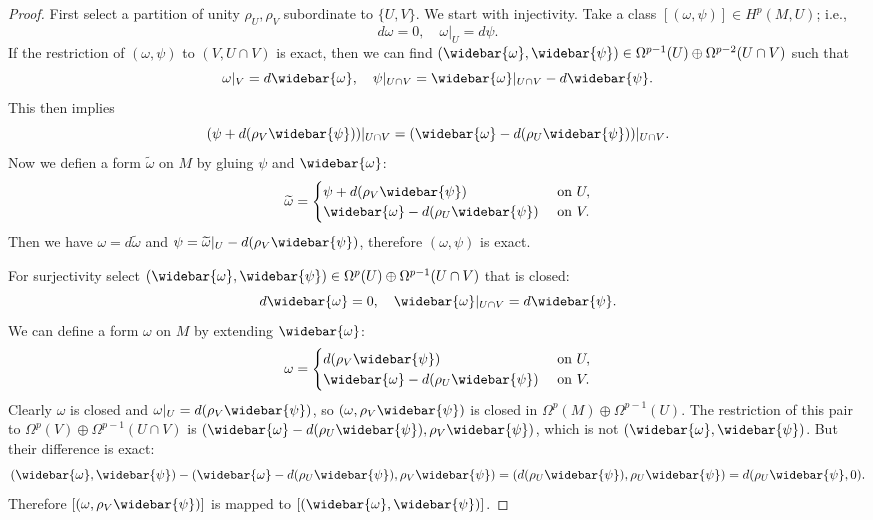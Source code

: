 \begin{proof}
First select a partition of unity $\rho_U,\rho_V$ subordinate to $\{U,V\}$. We start with injectivity. Take a class $[(\omega,\psi)]\in H^p(M,U)$; i.e.,
\[d\omega=0,\quad \omega|_U=d\psi.\]
If the restriction of $(\omega,\psi)$ to $(V,U\cap V)$ is exact, then we can find $(\widebar{\omega},\widebar{\psi})\in\Omega^{p-1}(U)\oplus\Omega^{p-2}(U\cap V)$ such that
\[\omega|_V=d\widebar{\omega},\quad \psi|_{U\cap V}=\widebar{\omega}|_{U\cap V}-d\widebar{\psi}.\]
This then implies
\[(\psi+d(\rho_V\widebar{\psi}))|_{U\cap V}=(\widebar{\omega}-d(\rho_U\widebar{\psi}))|_{U\cap V}.\]
Now we defien a form $\widetilde{\omega}$ on $M$ by gluing $\psi$ and $\widebar{\omega}$:
\[\widetilde{\omega}=\begin{cases}
\psi+d(\rho_V\widebar{\psi})&\text{ on }U,\\
\widebar{\omega}-d(\rho_U\widebar{\psi})&\text{ on }V.
\end{cases}\]
Then we have $\omega=d\widetilde{\omega}$ and $\psi=\widetilde{\omega}|_U-d(\rho_V\widebar{\psi})$, therefore $(\omega,\psi)$ is exact.\par
For surjectivity select $(\widebar{\omega},\widebar{\psi})\in\Omega^p(U)\oplus\Omega^{p-1}(U\cap V)$ that is closed:
\[d\widebar{\omega}=0,\quad\widebar{\omega}|_{U\cap V}=d\widebar{\psi}.\]
We can define a form $\omega$ on $M$ by extending $\widebar{\omega}$:
\[\omega=\begin{cases}
d(\rho_V\widebar{\psi})&\text{ on }U,\\
\widebar{\omega}-d(\rho_U\widebar{\psi})&\text{ on }V.
\end{cases}\]
Clearly $\omega$ is closed and $\omega|_{U}=d(\rho_V\widebar{\psi})$, so $(\omega,\rho_V\widebar{\psi})$ is closed in $\Omega^p(M)\oplus\Omega^{p-1}(U)$. The restriction of 
this pair to $\Omega^p(V)\oplus\Omega^{p-1}(U\cap V)$ is $(\widebar{\omega}-d(\rho_U\widebar{\psi}),\rho_V\widebar{\psi})$, which is not $(\widebar{\omega},\widebar{\psi})$. 
But their difference is exact:
\[(\widebar{\omega},\widebar{\psi})-(\widebar{\omega}-d(\rho_U\widebar{\psi}),\rho_V\widebar{\psi})=(d(\rho_U\widebar{\psi}),\rho_U\widebar{\psi})=d(\rho_U\widebar{\psi},0).\]
Therefore $[(\omega,\rho_V\widebar{\psi})]$ is mapped to $[(\widebar{\omega},\widebar{\psi})]$.
\end{proof}
